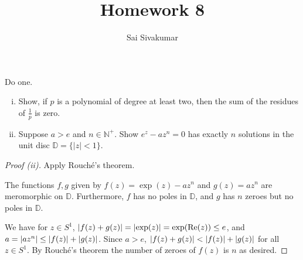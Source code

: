 \documentclass[12pt]{amsart}
\title{Homework 8}
\author{Sai Sivakumar}
\newcommand{\NN}{\mathbb{N}}
\newcommand{\DD}{\mathbb{D}}
\begin{document}
\maketitle

\thispagestyle{empty}
 Do one.
\begin{enumerate}[(i)]\itemsep=15pt
\item  Show, if $p$ is a polynomial of degree at least two, then
 the sum of the residues of $\frac{1}{p}$ is zero.
\item  Suppose $a>e$ and $n\in\NN^+.$ Show $e^z-az^n=0$ has exactly 
 $n$ solutions in the unit disc $\DD=\{|z|<1\}.$
\end{enumerate}
 
\bigskip

\begin{proof}[Proof (ii)]
\baselineskip=24pt
Apply Rouch\'e's theorem.

The functions $f,g$ given by $f(z) = \exp(z)-az^n$ and $g(z) = az^n$ are meromorphic on $\mathbb{D}$. Furthermore, $f$ has no poles in $\mathbb{D}$, and $g$ has $n$ zeroes but no poles in $\mathbb{D}$.

We have for $z\in S^1$, $\abs{f(z)+g(z)} = \abs{\exp(z)} = \exp(\Re(z))\leq e$, and $a = \abs{az^n} \leq \abs{f(z)}+\abs{g(z)}$. Since $a>e$, $\abs{f(z)+g(z)}<\abs{f(z)}+\abs{g(z)}$ for all $z\in S^1$. By Rouch\'e's theorem the number of zeroes of $f(z)$ is $n$ as desired.
\end{proof}
\end{document}
